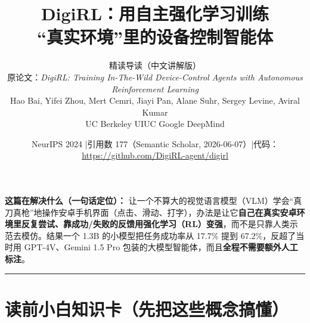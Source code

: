 \documentclass[11pt,UTF8,fontset=fandol]{ctexart}
\title{\textbf{DigiRL：用自主强化学习训练\\“真实环境”里的设备控制智能体}}
\author{精读导读（中文讲解版）\\[2pt]
原论文：\textit{DigiRL: Training In-The-Wild Device-Control Agents with Autonomous Reinforcement Learning}\\[2pt]
Hao Bai, Yifei Zhou, Mert Cemri, Jiayi Pan, Alane Suhr, Sergey Levine, Aviral Kumar\\
UC Berkeley \quad UIUC \quad Google DeepMind}
\date{NeurIPS 2024 \quad|\quad 引用数 177（Semantic Scholar, 2026-06-07）\quad|\quad 代码：\url{https://github.com/DigiRL-agent/digirl}}
\begin{document}
\maketitle

\noindent\textbf{这篇在解决什么（一句话定位）：}
让一个不算大的视觉语言模型（VLM）学会“真刀真枪”地操作安卓手机界面（点击、滑动、打字），办法是让它\textbf{自己在真实安卓环境里反复尝试、靠成功/失败的反馈用强化学习（RL）变强}，而不是只靠人类示范去模仿。结果一个 1.3B 的小模型把任务成功率从 17.7\% 提到 67.2\%，反超了当时用 GPT-4V、Gemini 1.5 Pro 包装的大模型智能体，而且\textbf{全程不需要额外人工标注}。

\medskip
\hrule
\medskip

\section*{读前小白知识卡（先把这些概念搞懂）}
\end{document}
